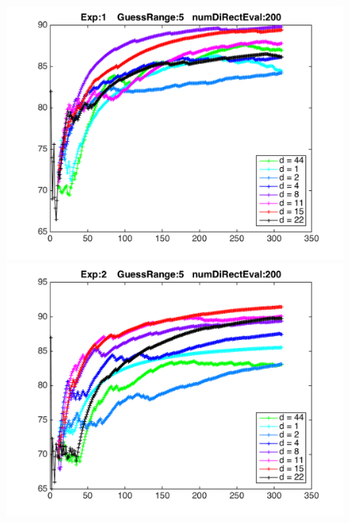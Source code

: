 \documentclass{article}
\begin{document}
\begin{figure}[!htbp]
\begin{minipage}{0.45\textwidth}
\includegraphics[width = \textwidth]{beta-1.png}
\end{minipage}
\begin{minipage}{0.45\textwidth}
\includegraphics[width = \textwidth]{beta-2.png}
\end{minipage}
\end{figure}
\end{document}
